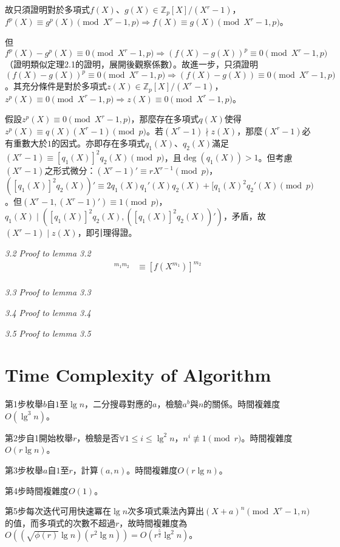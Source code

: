 \documentclass{article}
\newcommand{\nequiv}{\not\equiv}
\begin{document}
    故只須證明對於多項式$f(X)$、$g(X)\in \mathbb{Z}_{p}[X]/(X^r-1)$，$f^p(X)\equiv g^p(X)\pmod{X^r-1,p}\Rightarrow f(X)\equiv g(X)\pmod{X^r-1,p}$。

    但$f^p(X)-g^p(X)\equiv 0\pmod{X^r-1,p}\Rightarrow (f(X)-g(X))^p\equiv 0\pmod{X^r-1,p}$（證明類似定理2.1的證明，展開後觀察係數）。故進一步，只須證明$(f(X)-g(X))^p\equiv 0\pmod{X^r-1,p}\Rightarrow(f(X)-g(X))\equiv 0\pmod{X^r-1,p}$。其充分條件是對於多項式$z(X)\in\mathbb{Z}_{p}[X]/(X^r-1)$，$z^p(X)\equiv 0\pmod{X^r-1,p}\Rightarrow z(X)\equiv 0\pmod{X^r-1,p}$。

    假設$z^p(X)\equiv 0\pmod{X^r-1,p}$，那麼存在多項式$q(X)$使得$z^p(X)\equiv q(X)(X^r-1)\pmod{p}$。若$(X^r-1)\nmid z(X)$，那麼$(X^r-1)$必有重數大於$1$的因式。亦即存在多項式$q_1(X)$、$q_2(X)$滿足$(X^r-1)\equiv [q_1(X)]^2q_2(X)\pmod{p}$，且$\deg(q_1(X))>1$。但考慮$(X^r-1)$之形式微分：$(X^r-1)'\equiv rX^{r-1}\pmod{p}$，$([q_1(X)]^2q_2(X))'\equiv 2q_1(X)q_1'(X)q_2(X)+[q_1(X)^2q_2'(X)\pmod{p}$。但$(X^r-1,(X^r-1)')\equiv 1\pmod{p}$，$q_1(X)\mid([q_1(X)]^2q_2(X), ([q_1(X)]^2q_2(X))')$，矛盾，故$(X^r-1)\mid z(X)$，即引理得證。

\noindent\textit{3.2 Proof to lemma 3.2}
    \begin{align*}
    [f(X)]^{m_1m_2}&\equiv [f(X^{m_1})]^{m_2}\\
    \end{align*}

\noindent\textit{3.3 Proof to lemma 3.3}

\noindent\textit{3.4 Proof to lemma 3.4}

\noindent\textit{3.5 Proof to lemma 3.5}

\section{Time Complexity of Algorithm}

    第1步枚舉$b$自$1$至$\lg n$，二分搜尋對應的$a$，檢驗$a^b$與$n$的關係。時間複雜度$O(\lg^3n)$。

    第2步自1開始枚舉$r$，檢驗是否$\forall 1\leq i\leq\lg^2n$，$n^i\nequiv 1\pmod{r}$。時間複雜度$O(r\lg n)$。

    第3步枚舉$a$自$1$至$r$，計算$(a,n)$。時間複雜度$O(r\lg n)$。

    第4步時間複雜度$O(1)$。

    第5步每次迭代可用快速冪在$\lg n$次多項式乘法內算出$(X+a)^n\pmod{X^r-1, n}$的值，而多項式的次數不超過$r$，故時間複雜度為$O((\sqrt{\phi(r)}\lg n)(r^2\lg n))=O(r^{\frac{5}{2}}\lg^2n)$。
\end{document}
